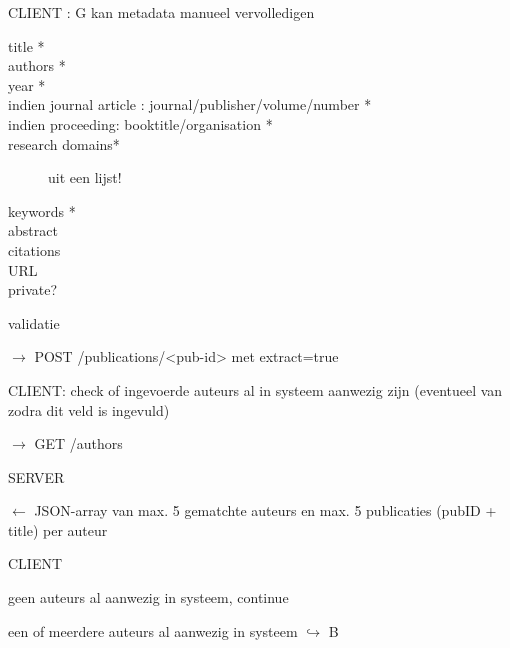 \documentclass{article}
\begin{document}
\begin{description}
\item CLIENT :  G kan metadata manueel vervolledigen 
	\begin{description}
 	\item[title * ]  \hfill 
  	\item[authors * ] \hfill 
	\item[year * ] \hfill 
	\item[indien journal article : journal/publisher/volume/number *] \hfill 
  	\item[indien proceeding: booktitle/organisation *] \hfill 
	\item[research domains*] uit een lijst! \hfill 
	\item[keywords * ]  \hfill 
  	\item[abstract] \hfill 
   	\item[citations] \hfill 
    	\item[URL] \hfill 
	\item[private?]
  	\end{description}
	
	\begin{description}
	\item \checkmark validatie
	\item $\rightarrow$ POST /publications/<pub-id> met extract=true
	\end{description}
	
\item CLIENT: check of ingevoerde auteurs al in systeem aanwezig zijn  (eventueel van zodra dit veld is ingevuld)
	\begin{description}
	\item $\rightarrow$  GET /authors
	\end{description}
	
\item SERVER 
	\begin{description}
	\item $\leftarrow$ JSON-array van max. 5 gematchte auteurs en max. 5 publicaties (pubID + title) per auteur 
	\end{description}
	
\item CLIENT 
	\begin{description}
	\item geen auteurs al aanwezig in systeem, continue 
	\item een of meerdere auteurs al aanwezig in systeem $\hookrightarrow$ B
	\end{description}
	

\end{description}
\end{document}
